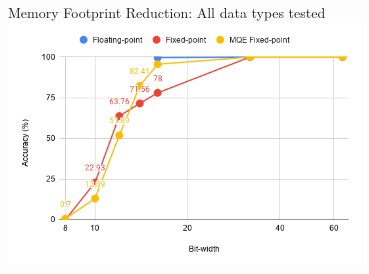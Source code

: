\begin{frame}{Memory Footprint Reduction: All data types tested}
	\centering
	\includegraphics[width=0.7\textwidth]{../Images/Weights-distributions/data-types-accuracy-chart.png}\\
\end{frame}
